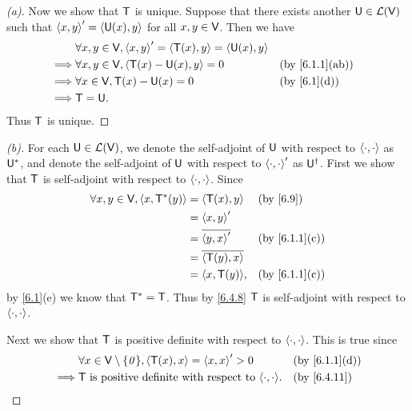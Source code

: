 \begin{proof}[(a)]
	Now we show that \(\mathsf{T}\) is unique.
	Suppose that there exists another \(\mathsf{U} \in \mathcal{L}(\mathsf{V})\) such that \(\left\langle x, y\right\rangle' = \left\langle\mathsf{U}(x), y\right\rangle\) for all \(x, y \in \mathsf{V}\).
	Then we have
	\begin{align*}
		         & \forall x, y \in \V, \inn{x, y}' = \inn{\T(x), y} = \inn{\U(x), y}                     \\
		\implies & \forall x, y \in \V, \inn{\T(x) - \U(x), y} = 0                    &  & \by{6.1.1}[ab] \\
		\implies & \forall x \in \V, \T(x) - \U(x) = 0                                &  & \by{6.1}[d]    \\
		\implies & \T = \U.
	\end{align*}
	Thus \(\mathsf{T}\) is unique.
\end{proof}

\begin{proof}[(b)]
	For each \(\mathsf{U} \in \mathcal{L}(\mathsf{V})\), we denote the self-adjoint of \(\mathsf{U}\) with respect to \(\left\langle\cdot, \cdot\right\rangle\) as \(\mathsf{U}^*\), and denote the self-adjoint of \(\mathsf{U}\) with respect to \(\left\langle\cdot, \cdot\right\rangle'\) as \(\mathsf{U}^{\dag}\).
	First we show that \(\mathsf{T}\) is self-adjoint with respect to \(\left\langle\cdot, \cdot\right\rangle\).
	Since
	\begin{align*}
		\forall x, y \in \V, \inn{x, \T^*(y)} & = \inn{\T(x), y}        &  & \by{6.9}      \\
		                                      & = \inn{x, y}'                              \\
		                                      & = \conj{\inn{y, x}'}    &  & \by{6.1.1}[c] \\
		                                      & = \conj{\inn{\T(y), x}}                    \\
		                                      & = \inn{x, \T(y)},       &  & \by{6.1.1}[c]
	\end{align*}
	by \cref{6.1}(e) we know that \(\mathsf{T}^* = \mathsf{T}\).
	Thus by \cref{6.4.8} \(\mathsf{T}\) is self-adjoint with respect to \(\left\langle\cdot, \cdot\right\rangle\).

	Next we show that \(\mathsf{T}\) is positive definite with respect to \(\left\langle\cdot, \cdot\right\rangle\).
	This is true since
	\begin{align*}
		         & \forall x \in \V \setminus \set{\zv}, \inn{\T(x), x} = \inn{x, x}' > 0 &  & \by{6.1.1}[d] \\
		\implies & \T \text{ is positive definite with respect to } \inn{\cdot, \cdot}.   &  & \by{6.4.11}
	\end{align*}


\end{proof}
